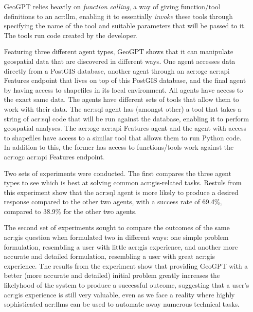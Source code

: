 GeoGPT relies heavily on \textit{function calling}, a way of giving function/tool definitions to an \acrshort{acr:llm}, enabling it to essentially \textit{invoke} these tools through specifying the name of the tool and suitable parameters that will be passed to it. The tools run code created by the developer.

Featuring three different agent types, GeoGPT shows that it can manipulate geospatial data that are discovered in different ways. One agent accesses data directly from a PostGIS database, another agent through an \acrshort{acr:ogc} \acrshort{acr:api} Features endpoint that lives on top of this PostGIS database, and the final agent by having access to shapefiles in its local environment. All agents have access to the exact same data. The agents have different sets of tools that allow them to work with their data. The \acrshort{acr:sql} agent has (amongst other) a tool that takes a string of \acrshort{acr:sql} code that will be run against the database, enabling it to perform geospatial analyses. The \acrshort{acr:ogc} \acrshort{acr:api} Features agent and the agent with access to shapefiles have access to a similar tool that allows them to run Python code. In addition to this, the former has access to functions/tools work against the \acrshort{acr:ogc} \acrshort{acr:api} Features endpoint.

Two sets of experiments were conducted. The first compares the three agent types to see which is best at solving common \acrshort{acr:gis}-related tasks. Restuls from this experiment show that the \acrshort{acr:sql} agent is more likely to produce a desired response compared to the other two agents, with a success rate of 69.4\%, compared to 38.9\% for the other two agents.

The second set of experiments sought to compare the outcomes of the same \acrshort{acr:gis} question when formulated two in different ways: one simple problem formulation, resembling a user with little \acrshort{acr:gis} experience, and another more accurate and detailed formulation, resembling a user with great \acrshort{acr:gis} experience. The results from the experiment show that providing GeoGPT with a better (more accurate and detailed) initial problem greatly increases the likelyhood of the system to produce a successful outcome, suggesting that a user's \acrshort{acr:gis} experience is still very valuable, even as we face a reality where highly sophisticated \glspl{acr:llm} can be used to automate away numerous technical tasks.
